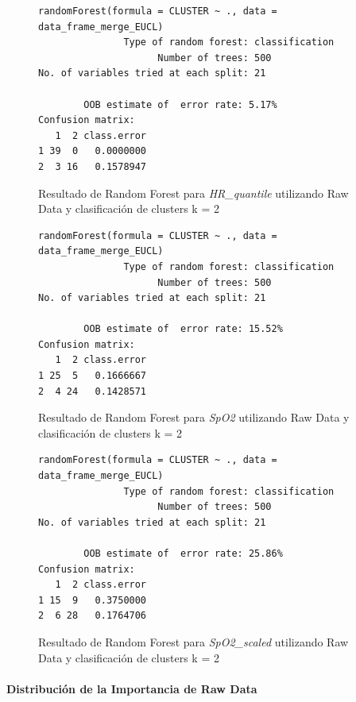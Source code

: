 \begin{figure}[H]
    \centering
    \begin{lstlisting}[frame=single, basicstyle=\small\ttfamily]
        randomForest(formula = CLUSTER ~ ., data = data_frame_merge_EUCL) 
               Type of random forest: classification
                     Number of trees: 500
No. of variables tried at each split: 21

        OOB estimate of  error rate: 5.17%
Confusion matrix:
   1  2 class.error
1 39  0   0.0000000
2  3 16   0.1578947
    \end{lstlisting}
    \caption{Resultado de Random Forest para \textit{HR\_quantile} utilizando Raw Data y clasificación de clusters k = 2}
    \label{fig:random_forest_eucl_result_RF_3}
\end{figure}

\begin{figure}[H]
    \centering
    \begin{lstlisting}[frame=single, basicstyle=\small\ttfamily]
randomForest(formula = CLUSTER ~ ., data = data_frame_merge_EUCL) 
               Type of random forest: classification
                     Number of trees: 500
No. of variables tried at each split: 21

        OOB estimate of  error rate: 15.52%
Confusion matrix:
   1  2 class.error
1 25  5   0.1666667
2  4 24   0.1428571
    \end{lstlisting}
    \caption{Resultado de Random Forest para \textit{SpO2} utilizando Raw Data y clasificación de clusters k = 2}\label{fig:random_forest_eucl_result_RF_4}
\end{figure}
\begin{figure}[H]
    \centering
    \begin{lstlisting}[frame=single, basicstyle=\small\ttfamily]
        randomForest(formula = CLUSTER ~ ., data = data_frame_merge_EUCL) 
               Type of random forest: classification
                     Number of trees: 500
No. of variables tried at each split: 21

        OOB estimate of  error rate: 25.86%
Confusion matrix:
   1  2 class.error
1 15  9   0.3750000
2  6 28   0.1764706
    \end{lstlisting}
    \caption{Resultado de Random Forest para \textit{SpO2\_scaled} utilizando Raw Data y clasificación de clusters k = 2}
    \label{fig:random_forest_eucl_result_RF_5}
\end{figure}

\paragraph{Distribución de la Importancia de Raw Data}

